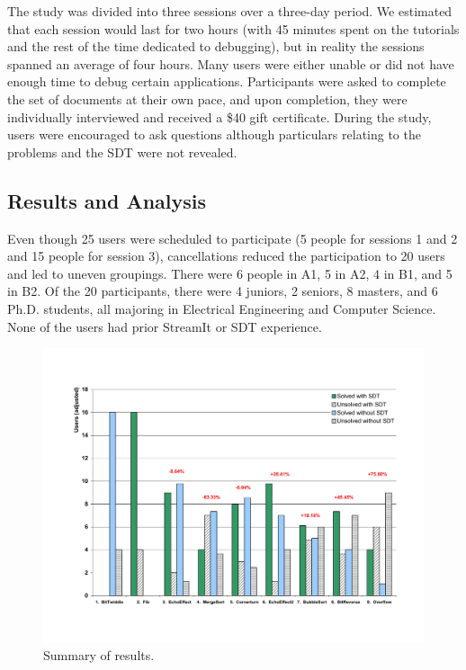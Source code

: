 \documentclass[11pt, letterpaper, onecolumn]{article}
\begin{document}
The study was divided into three sessions over a three-day period.  We
estimated that each session would  last for two hours (with 45 minutes
spent  on  the  tutorials  and  the  rest of  the  time  dedicated  to
debugging), but  in reality  the sessions spanned  an average  of four
hours.  Many users  were either unable or did not  have enough time to
debug certain  applications.  Participants were asked  to complete the
set of  documents at  their own pace,  and upon completion,  they were
individually interviewed and received a \$40 gift certificate.  During
the study, users were encouraged to ask questions although particulars
relating to the problems and the SDT were not revealed.


\subsection{Results and Analysis}

Even though 25  users were  scheduled  to participate  (5 people  for
sessions 1 and  2 and 15 people for  session 3), cancellations reduced
the participation to 20 users  and led to uneven groupings. There were
6 people in A1, 5 in A2, 4 in B1, and 5 in B2. Of the 20 participants,
there were 4 juniors, 2 seniors,  8 masters, and 6 Ph.D. students, all
majoring in Electrical Engineering and Computer Science. None of the
users had prior StreamIt or SDT experience.

\begin{figure}[t]
\begin{center}
  \includegraphics[scale=.5, angle=0]{./users-results.pdf}
  \caption{Summary of results.}
  \label{fig:solutions}
\end{center}
\end{figure}
\end{document}

